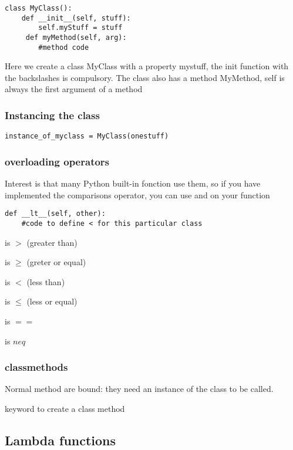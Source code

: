 \begin{lstlisting}
class MyClass():
    def __init__(self, stuff):
        self.myStuff = stuff
     def myMethod(self, arg):
     	#method code
\end{lstlisting}

			Here we create a class MyClass with a property mystuff, the  init function with the backslashes is compulsory.
			The class also has a method MyMethod, self is always the first argument of a method

		\subsubsection{Instancing the class}

\begin{lstlisting}
instance_of_myclass = MyClass(onestuff)
\end{lstlisting}


		\subsubsection{overloading operators}

			Interest is that many Python built-in fonction use them, so if you have implemented the comparisons operator, you can use  and  on your function

\begin{lstlisting}
def __lt__(self, other):
	#code to define < for this particular class
\end{lstlisting}

			 is $>$ (greater than)

			 is $\geq$ (greter or equal)

			 is $<$ (less than)

			 is $\leq$ (less or equal)

			 is $==$

			 is $neq$ 

		\subsubsection{classmethods}

			Normal method are bound: they need an instance of the class to be called.

			 keyword to create a class method


	\subsection{Lambda functions}

